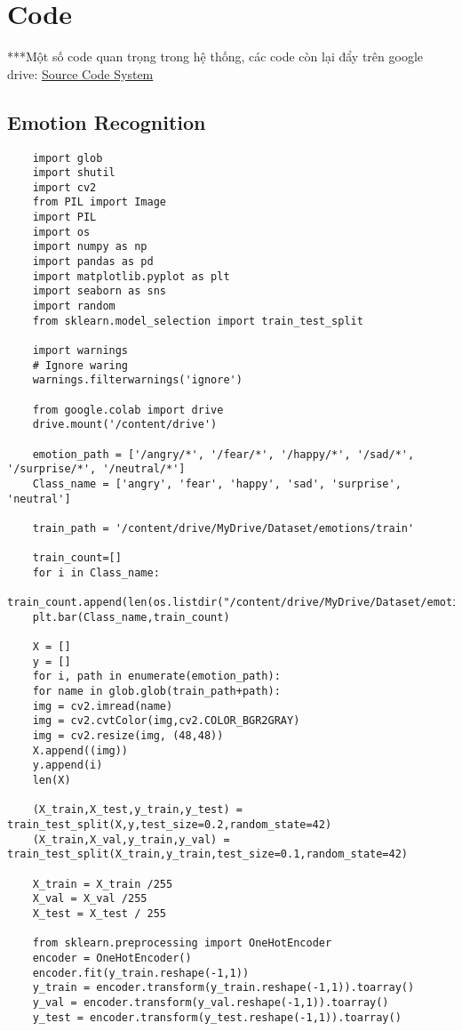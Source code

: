 \chapter*{Code}

\label{Mã nguồn hệ thống}

***Một số code quan trọng trong hệ thống, các code còn lại đẩy trên google drive: \href{https://drive.google.com/drive/folders/1pspIib_DGpTEYfZ0l5Xm07Y1BCCl97d_?fbclid=IwAR1OaNPHzwGAtbG9NQQnDHE2cXxzpvXHW-w8ted6p9JCAnQck757pyKbOlw}{Source Code System} 

\section{Emotion Recognition}

\begin{lstlisting}
	import glob
	import shutil
	import cv2 
	from PIL import Image
	import PIL
	import os
	import numpy as np
	import pandas as pd
	import matplotlib.pyplot as plt
	import seaborn as sns
	import random 
	from sklearn.model_selection import train_test_split
	
	import warnings
	# Ignore waring
	warnings.filterwarnings('ignore')
	
	from google.colab import drive
	drive.mount('/content/drive')
	
	emotion_path = ['/angry/*', '/fear/*', '/happy/*', '/sad/*', '/surprise/*', '/neutral/*']
	Class_name = ['angry', 'fear', 'happy', 'sad', 'surprise', 'neutral']
	
	train_path = '/content/drive/MyDrive/Dataset/emotions/train'
	
	train_count=[]
	for i in Class_name:
	train_count.append(len(os.listdir("/content/drive/MyDrive/Dataset/emotions/train/"+i+"/")))
	plt.bar(Class_name,train_count)
	
	X = []
	y = []
	for i, path in enumerate(emotion_path):
	for name in glob.glob(train_path+path):
	img = cv2.imread(name)
	img = cv2.cvtColor(img,cv2.COLOR_BGR2GRAY)
	img = cv2.resize(img, (48,48))
	X.append((img))
	y.append(i)
	len(X)
	
	(X_train,X_test,y_train,y_test) = train_test_split(X,y,test_size=0.2,random_state=42)
	(X_train,X_val,y_train,y_val) = train_test_split(X_train,y_train,test_size=0.1,random_state=42)
	
	X_train = X_train /255
	X_val = X_val /255
	X_test = X_test / 255
	
	from sklearn.preprocessing import OneHotEncoder
	encoder = OneHotEncoder()
	encoder.fit(y_train.reshape(-1,1))
	y_train = encoder.transform(y_train.reshape(-1,1)).toarray()
	y_val = encoder.transform(y_val.reshape(-1,1)).toarray()
	y_test = encoder.transform(y_test.reshape(-1,1)).toarray()
	

\end{lstlisting}
